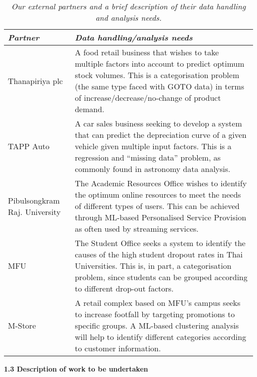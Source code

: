\documentclass[11pt]{article}
\begin{document}
  \begin{table}[h]
  \begin{tabular}{p{2.8cm}|p{13.4cm}}
    {\it Partner} & {\it Data handling/analysis needs}\\
    \hline
    \hline
      Thanapiriya plc & A food retail business that wishes to take multiple factors into account to predict optimum stock volumes. This is a categorisation problem (the same type faced with GOTO data) in terms of increase/decrease/no-change of product demand.\\
    \hline
      TAPP Auto & A car sales business seeking to develop a system that can predict the depreciation curve of a given vehicle given multiple input factors. This is a regression and ``missing data'' problem, as commonly found in astronomy data analysis.\\
    \hline
       Pibulsongkram Raj. University & The Academic Resources Office wishes to identify the optimum online resources to meet the needs of different types of users. This can be achieved through ML-based Personalised Service Provision as often used by streaming services.\\
    \hline
      MFU & The Student Office seeks a system to identify the causes of the high student dropout rates in Thai Universities. This is, in part, a categorisation problem, since students can be grouped according to different drop-out factors. \\
    \hline
      M-Store & A retail complex based on MFU's campus seeks to increase footfall by targeting promotions to specific groups. A ML-based clustering analysis will help to identify different categories according to customer information. \\
    \hline
  \end{tabular}
  \caption{\it Our external partners and a brief description of their data handling and analysis needs. }
  \vspace{-5mm}
  \end{table}
  \vspace{3mm}
  \noindent
  {\large \bf 1.3 Description of work to be undertaken}
  
\end{document}
